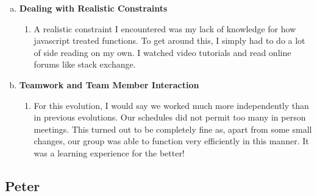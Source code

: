 \documentclass[11pt]{article}   %
\begin{document}
\begin{enumerate} [a)]
\begin{enumerate} [$\cdot$]
\item One use of first class functions is the callback, a way that javascript handles asynchronous functions. I wrote my own asynchronous function that utilized a callback exit. Unfortunately this function produced an error I had never seen before, one that dealt with http protocols. Specifically the response header was being set after the response had been sent. Confusing... . However, I was able to read the stack trace in the console, pinpoint the location of the error, and deduce the type of error. With the error type and location, I was able to eventually fix the bug by reading internet forums and Express.js API pages.
\end{enumerate}
\item {\bf Dealing with Realistic Constraints}
\begin{enumerate} [$\cdot$]
\item A realistic constraint I encountered was my lack of knowledge for how javascript treated functions. To get around this, I simply had to do a lot of side reading on my own. I watched video tutorials and read online forums like stack exchange. 
\end{enumerate}
\item  {\bf Teamwork and Team Member Interaction}
\begin{enumerate} [$\cdot$]
\item For this evolution, I would say we worked much more independently than in previous evolutions. Our schedules did not permit too many in person meetings. This turned out to be completely fine as, apart from some small changes, our group was able to function very efficiently in this manner. It was a learning experience for the better!
\end{enumerate}
\end{enumerate}

\subsection*{Peter}
\end{document}

